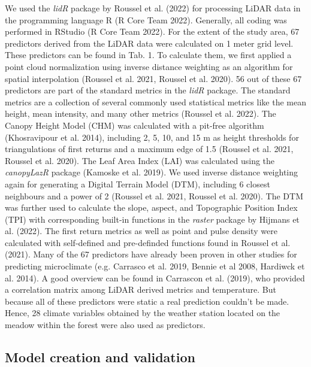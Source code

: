 \documentclass[5p]{elsarticle} %
\begin{document}
We used the \emph{lidR} package by Roussel et al. (2022) for processing LiDAR data in the programming language R (R Core Team 2022). Generally, all coding was performed in RStudio (R Core Team 2022). 
For the extent of the study area, 67 predictors derived from the LiDAR data were calculated on 1 meter grid level. These predictors can be found in Tab. 1. To calculate them, we first applied a point cloud normalization using inverse distance weighting as an algorithm for spatial interpolation (Roussel et al. 2021, Roussel et al. 2020). 56 out of these 67 predictors are part of the standard metrics in the \emph{lidR} package. The standard metrics are a collection of several commonly used statistical metrics like the mean height, mean intensity, and many other metrics (Roussel et al. 2022). The Canopy Height Model (CHM) was calculated with a pit-free algorithm (Khosravipour et al. 2014), including 2, 5, 10, and 15 m as height thresholds for triangulations of first returns and a maximum edge of 1.5 (Roussel et al. 2021, Roussel et al. 2020). The Leaf Area Index (LAI) was calculated using the \emph{canopyLazR} package (Kamoske et al. 2019). We used inverse distance weighting again for generating a Digital Terrain Model (DTM), including 6 closest neighbours and a power of 2 (Roussel et al. 2021, Roussel et al. 2020). The DTM was further used to calculate the slope, aspect, and Topographic Position Index (TPI) with corresponding built-in functions in the \emph{raster} package by Hijmans et al. (2022). The first return metrics as well as point and pulse density were calculated with self-defined and pre-definded functions found in Roussel et al. (2021). Many of the 67 predictors have already been proven in other studies for predicting microclimate (e.g. Carrasco et al. 2019, Bennie et al 2008, Hardiwck et al. 2014). A good overview can be found in Carrascon et al. (2019), who provided a correlation matrix among LiDAR derived metrics and temperature. But because all of these predictors were static a real prediction couldn’t be made. Hence, 28 climate variables obtained by the weather station located on the meadow within the forest were also used as predictors.

\hypertarget{model creation and validation}{%
\subsection{\texorpdfstring{Model creation and validation\\
}{Model creation and validation }}\label{model-creation-and-validation}}
\end{document}
